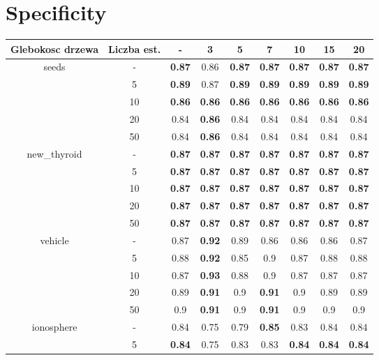 \documentclass{article}%
\begin{document}
%
\section*{Specificity}%
\begin{tabular}{c|c|ccccccc}%
\hline%
Glebokosc drzewa&Liczba est.&{-}&3&5&7&10&15&20\\%
\hline%
\multirow{5}{*}{seeds}&{-}&\textbf{0.87}&0.86&\textbf{0.87}&\textbf{0.87}&\textbf{0.87}&\textbf{0.87}&\textbf{0.87}\\%
\cline{2%
-%
9}%
&5&\textbf{0.89}&0.87&\textbf{0.89}&\textbf{0.89}&\textbf{0.89}&\textbf{0.89}&\textbf{0.89}\\%
\cline{2%
-%
9}%
&10&\textbf{0.86}&\textbf{0.86}&\textbf{0.86}&\textbf{0.86}&\textbf{0.86}&\textbf{0.86}&\textbf{0.86}\\%
\cline{2%
-%
9}%
&20&0.84&\textbf{0.86}&0.84&0.84&0.84&0.84&0.84\\%
\cline{2%
-%
9}%
&50&0.84&\textbf{0.86}&0.84&0.84&0.84&0.84&0.84\\%
\hline%
\multirow{5}{*}{new\_thyroid}&{-}&\textbf{0.87}&\textbf{0.87}&\textbf{0.87}&\textbf{0.87}&\textbf{0.87}&\textbf{0.87}&\textbf{0.87}\\%
\cline{2%
-%
9}%
&5&\textbf{0.87}&\textbf{0.87}&\textbf{0.87}&\textbf{0.87}&\textbf{0.87}&\textbf{0.87}&\textbf{0.87}\\%
\cline{2%
-%
9}%
&10&\textbf{0.87}&\textbf{0.87}&\textbf{0.87}&\textbf{0.87}&\textbf{0.87}&\textbf{0.87}&\textbf{0.87}\\%
\cline{2%
-%
9}%
&20&\textbf{0.87}&\textbf{0.87}&\textbf{0.87}&\textbf{0.87}&\textbf{0.87}&\textbf{0.87}&\textbf{0.87}\\%
\cline{2%
-%
9}%
&50&\textbf{0.87}&\textbf{0.87}&\textbf{0.87}&\textbf{0.87}&\textbf{0.87}&\textbf{0.87}&\textbf{0.87}\\%
\hline%
\multirow{5}{*}{vehicle}&{-}&0.87&\textbf{0.92}&0.89&0.86&0.86&0.86&0.87\\%
\cline{2%
-%
9}%
&5&0.88&\textbf{0.92}&0.85&0.9&0.87&0.88&0.88\\%
\cline{2%
-%
9}%
&10&0.87&\textbf{0.93}&0.88&0.9&0.87&0.87&0.87\\%
\cline{2%
-%
9}%
&20&0.89&\textbf{0.91}&0.9&\textbf{0.91}&0.9&0.89&0.89\\%
\cline{2%
-%
9}%
&50&0.9&\textbf{0.91}&0.9&\textbf{0.91}&0.9&0.9&0.9\\%
\hline%
\multirow{5}{*}{ionosphere}&{-}&0.84&0.75&0.79&\textbf{0.85}&0.83&0.84&0.84\\%
\cline{2%
-%
9}%
&5&\textbf{0.84}&0.75&0.83&0.83&\textbf{0.84}&\textbf{0.84}&\textbf{0.84}\\%

\end{tabular}
\end{document}
